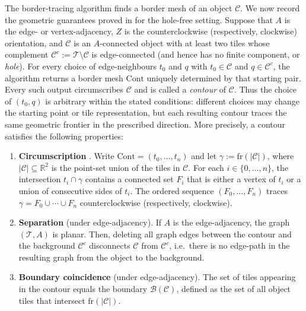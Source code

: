 The border-tracing algorithm finds a border mesh of an object $\mathcal{C}$.
We now record the geometric guarantees proved in \cite{WiederholdMatosWiederhold2026} for the hole-free setting.
Suppose that $A$ is the edge- or vertex-adjacency, $Z$ is the counterclockwise (respectively, clockwise) orientation, and $\mathcal{C}$ is an $A$-connected object with at least two tiles whose complement $\mathcal{C}^c:=\mathcal{T}\setminus\mathcal{C}$ is edge-connected (and hence has no finite component, or \emph{hole}).
For every choice of edge-neighbours $t_0$ and $q$ with $t_0\in\mathcal{C}$ and $q\in\mathcal{C}^c$, the algorithm returns a border mesh $\mathrm{Cont}$ uniquely determined by that starting pair.
Every such output circumscribes $\mathcal{C}$ and is called a \emph{contour} of $\mathcal{C}$.
Thus the choice of $(t_0,q)$ is arbitrary within the stated conditions: different choices may change the starting point or tile representation, but each resulting contour traces the same geometric frontier in the prescribed direction.
More precisely, a contour satisfies the following properties:
\begin{enumerate}
    \item \textbf{Circumscription} \cite[Theorem~1]{WiederholdMatosWiederhold2026}.
    Write $\mathrm{Cont}=(t_0,\dots,t_n)$ and let $\gamma:=\mathrm{fr}(|\mathcal{C}|)$, where $|\mathcal{C}|\subseteq\mathbb{R}^2$ is the point-set union of the tiles in $\mathcal{C}$.
    For each $i\in\{0,\dots,n\}$, the intersection $t_i\cap\gamma$ contains a connected set $F_i$ that is either a vertex of $t_i$ or a union of consecutive sides of $t_i$.
    The ordered sequence $(F_0,\dots,F_n)$ traces $\gamma=F_0\cup\cdots\cup F_n$ counterclockwise (respectively, clockwise).

    \item \textbf{Separation} \cite[Theorem~2]{WiederholdMatosWiederhold2026} (under edge-adjacency).
    If $A$ is the edge-adjacency, the graph $(\mathcal{T},A)$ is planar.
    Then, deleting all graph edges between the contour and the background $\mathcal{C}^c$ disconnects $\mathcal{C}$ from $\mathcal{C}^c$, i.e.\ there is no edge-path in the resulting graph from the object to the background.

    \item \textbf{Boundary coincidence} \cite[Lemma~5]{WiederholdMatosWiederhold2026} (under edge-adjacency).
    The set of tiles appearing in the contour equals the boundary $\mathcal{B}(\mathcal{C})$, defined as the set of all object tiles that intersect $\mathrm{fr}(|\mathcal{C}|)$.
\end{enumerate}

